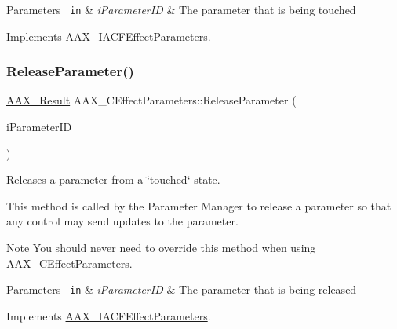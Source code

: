 \begin{DoxyParams}[1]{Parameters}
\mbox{\texttt{ in}}  & {\em i\+Parameter\+ID} & The parameter that is being touched \\
\hline
\end{DoxyParams}


Implements \mbox{\hyperlink{a01669_ae82e80cbfd9cb837f8101a85f06856ba}{A\+A\+X\+\_\+\+I\+A\+C\+F\+Effect\+Parameters}}.

\mbox{\label{a01481_a39c2085d444916000acec5da3797ca37}} 
\subsubsection{\texorpdfstring{ReleaseParameter()}{ReleaseParameter()}}
{\footnotesize\ttfamily \mbox{\hyperlink{a00392_a4d8f69a697df7f70c3a8e9b8ee130d2f}{A\+A\+X\+\_\+\+Result}} A\+A\+X\+\_\+\+C\+Effect\+Parameters\+::\+Release\+Parameter (\begin{DoxyParamCaption}\item[{\mbox{\hyperlink{a00392_a1440c756fe5cb158b78193b2fc1780d1}{A\+A\+X\+\_\+\+C\+Param\+ID}}}]{i\+Parameter\+ID }\end{DoxyParamCaption})\hspace{0.3cm}{\ttfamily [virtual]}}



Releases a parameter from a \char`\"{}touched\char`\"{} state. 

This method is called by the Parameter Manager to release a parameter so that any control may send updates to the parameter.

\begin{DoxyNote}{Note}
You should never need to override this method when using \mbox{\hyperlink{a01481}{A\+A\+X\+\_\+\+C\+Effect\+Parameters}}.
\end{DoxyNote}

\begin{DoxyParams}[1]{Parameters}
\mbox{\texttt{ in}}  & {\em i\+Parameter\+ID} & The parameter that is being released \\
\hline
\end{DoxyParams}


Implements \mbox{\hyperlink{a01669_a2caf1b7b8e2dad62cf96f144479dee60}{A\+A\+X\+\_\+\+I\+A\+C\+F\+Effect\+Parameters}}.

